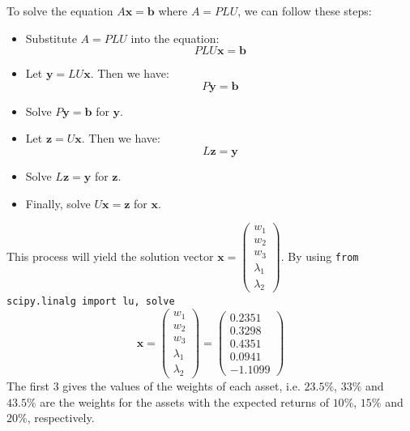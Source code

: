 \documentclass{article}
\begin{document}
To solve the equation \( A \mathbf{x} = \mathbf{b} \) where \( A = PLU \), we can follow these steps:

\begin{itemize}
    \item Substitute \( A = PLU \) into the equation:
          \[
              PLU \mathbf{x} = \mathbf{b}
          \]

    \item Let \( \mathbf{y} = LU \mathbf{x} \). Then we have:
          \[
              P \mathbf{y} = \mathbf{b}
          \]

    \item Solve \( P \mathbf{y} = \mathbf{b} \) for \( \mathbf{y} \).

    \item Let \( \mathbf{z} = U \mathbf{x} \). Then we have:
          \[
              L \mathbf{z} = \mathbf{y}
          \]

    \item Solve \( L \mathbf{z} = \mathbf{y} \) for \( \mathbf{z} \).

    \item Finally, solve \( U \mathbf{x} = \mathbf{z} \) for \( \mathbf{x} \).
\end{itemize}

This process will yield the solution vector \( \mathbf{x} = \begin{pmatrix} w_1 \\ w_2 \\ w_3 \\ \lambda_1 \\ \lambda_2 \end{pmatrix} \).
By using \texttt{from scipy.linalg import lu, solve}
\[
    \mathbf{x} =
    \begin{pmatrix}
        w_1       \\
        w_2       \\
        w_3       \\
        \lambda_1 \\
        \lambda_2
    \end{pmatrix}
    =
    \begin{pmatrix}
        0.2351 \\
        0.3298 \\
        0.4351 \\
        0.0941 \\
        -1.1099
    \end{pmatrix}
\]
The first 3 gives the values of the weights of each asset, i.e.
$23.5\%$, $33\%$ and $43.5\%$ are the weights for the assets with the expected returns of $10\%$, $15\%$ and $20\%$, respectively.
\end{document}
